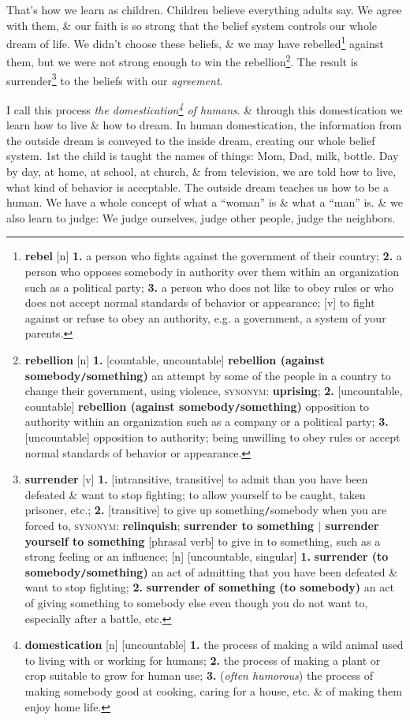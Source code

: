 \documentclass[oneside]{book}
\numberwithin{equation}{section}
\begin{document}
That's how we learn as children. Children believe everything adults say. We agree with them, \& our faith is so strong that the belief system controls our whole dream of life. We didn't choose these beliefs, \& we may have rebelled\footnote{\textbf{rebel} [n] \textbf{1.} a person who fights against the government of their country; \textbf{2.} a person who opposes somebody in authority over them within an organization such as a political party; \textbf{3.} a person who does not like to obey rules or who does not accept normal standards of behavior or appearance; [v] to fight against or refuse to obey an authority, e.g. a government, a system of your parents.} against them, but we were not strong enough to win the rebellion\footnote{\textbf{rebellion} [n] \textbf{1.} [countable, uncountable] \textbf{rebellion (against somebody\texttt{/}something)} an attempt by some of the people in a country to change their government, using violence, \textsc{synonym}: \textbf{uprising}; \textbf{2.} [uncountable, countable] \textbf{rebellion (against somebody\texttt{/}something)} opposition to authority within an organization such as a company or a political party; \textbf{3.} [uncountable] opposition to authority; being unwilling to obey rules or accept normal standards of behavior or appearance.}. The result is surrender\footnote{\textbf{surrender} [v] \textbf{1.} [intransitive, transitive] to admit than you have been defeated \& want to stop fighting; to allow yourself to be caught, taken prisoner, etc.; \textbf{2.} [transitive] to give up something\texttt{/}somebody when you are forced to, \textsc{synonym}: \textbf{relinquish}; \textbf{surrender to something $|$ surrender yourself to something} [phrasal verb] to give in to something, such as a strong feeling or an influence; [n] [uncountable, singular] \textbf{1.} \textbf{surrender (to somebody\texttt{/}something)} an act of admitting that you have been defeated \& want to stop fighting; \textbf{2.} \textbf{surrender of something (to somebody)} an act of giving something to somebody else even though you do not want to, especially after a battle, etc.} to the beliefs with our \textit{agreement}.

I call this process \textit{the domestication\footnote{\textbf{domestication} [n] [uncountable] \textbf{1.} the process of making a wild animal used to living with or working for humans; \textbf{2.} the process of making a plant or crop suitable to grow for human use; \textbf{3.} (\textit{often humorous}) the process of making somebody good at cooking, caring for a house, etc. \& of making them enjoy home life.} of humans}. \& through this domestication we learn how to live \& how to dream. In human domestication, the information from the outside dream is conveyed to the inside dream, creating our whole belief system. 1st the child is taught the names of things: Mom, Dad, milk, bottle. Day by day, at home, at school, at church, \& from television, we are told how to live, what kind of behavior is acceptable. The outside dream teaches us how to be a human. We have a whole concept of what a ``woman'' is \& what a ``man'' is. \& we also learn to judge: We judge ourselves, judge other people, judge the neighbors.
\end{document}
